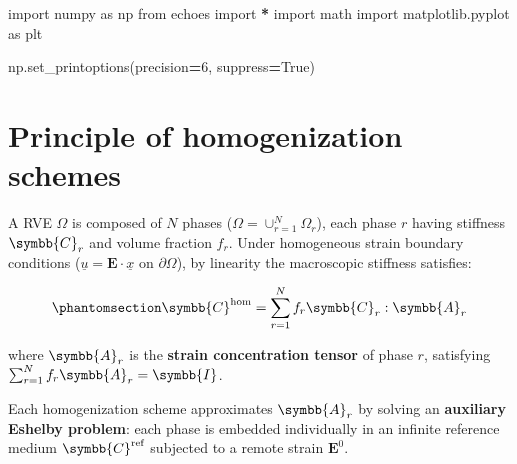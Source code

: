 \documentclass[
  a4paper,
  numbers=noendperiod,
  DIV=12]{scrreprt}
\newenvironment{Shaded}{\begin{snugshade}}{\end{snugshade}}
\newcommand{\DecValTok}[1]{\textcolor[rgb]{0.00,0.00,0.81}{#1}}
\newcommand{\ImportTok}[1]{#1}
\newcommand{\NormalTok}[1]{#1}
\newcommand{\OperatorTok}[1]{\textcolor[rgb]{0.81,0.36,0.00}{\textbf{#1}}}
\newcommand{\VariableTok}[1]{\textcolor[rgb]{0.00,0.00,0.00}{#1}}
\newcommand{\uu}[1]{{\symbf{{#1}}}}
\newcommand{\uuuu}[1]{{\symbb{{#1}}}}
\newcommand{\uv}[1]{{\underline{{#1}}}}
\newcommand{\x}{{\uv{{x}}}}
\newcommand{\E}{{\uu{{E}}}}
\begin{document}
\begin{tcolorbox}[enhanced jigsaw, arc=.35mm, bottomrule=.15mm, bottomtitle=1mm, breakable, colback=white, colbacktitle=quarto-callout-tip-color!10!white, colframe=quarto-callout-tip-color-frame, coltitle=black, left=2mm, leftrule=.75mm, opacityback=0, opacitybacktitle=0.6, rightrule=.15mm, title={Imports}, titlerule=0mm, toprule=.15mm, toptitle=1mm]

\begin{Shaded}
\begin{Highlighting}[]
\ImportTok{import}\NormalTok{ numpy }\ImportTok{as}\NormalTok{ np}
\ImportTok{from}\NormalTok{ echoes }\ImportTok{import} \OperatorTok{*}
\ImportTok{import}\NormalTok{ math}
\ImportTok{import}\NormalTok{ matplotlib.pyplot }\ImportTok{as}\NormalTok{ plt}

\NormalTok{np.set\_printoptions(precision}\OperatorTok{=}\DecValTok{6}\NormalTok{, suppress}\OperatorTok{=}\VariableTok{True}\NormalTok{)}
\end{Highlighting}
\end{Shaded}

\end{tcolorbox}

\section{Principle of homogenization
schemes}\label{sec-principle-schemes}

A RVE \(\Omega\) is composed of \(N\) phases
(\(\Omega = \cup_{r=1}^N \Omega_r\)), each phase \(r\) having stiffness
\(\uuuu{C}_r\) and volume fraction \(f_r\). Under homogeneous strain
boundary conditions (\(\uv{u} = \E \cdot \x\) on \(\partial\Omega\)), by
linearity the macroscopic stiffness satisfies:

\begin{equation}\protect\phantomsection\label{eq-Chom-general}{
\uuuu{C}^\textrm{hom} = \sum_{r=1}^N f_r \uuuu{C}_r : \uuuu{A}_r
}\end{equation}

where \(\uuuu{A}_r\) is the \textbf{strain concentration tensor} of
phase \(r\), satisfying \(\sum_{r=1}^N f_r \uuuu{A}_r = \uuuu{I}\).

Each homogenization scheme approximates \(\uuuu{A}_r\) by solving an
\textbf{auxiliary Eshelby problem}: each phase is embedded individually
in an infinite reference medium \(\uuuu{C}^\textrm{ref}\) subjected to a
remote strain \(\E^0\).
\end{document}
